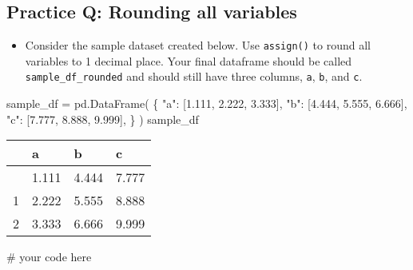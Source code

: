 \documentclass[
  letterpaper,
  DIV=11,
  numbers=noendperiod]{scrreprt}
\newenvironment{Shaded}{\begin{snugshade}}{\end{snugshade}}
\newcommand{\CommentTok}[1]{\textcolor[rgb]{0.37,0.37,0.37}{#1}}
\newcommand{\FloatTok}[1]{\textcolor[rgb]{0.68,0.00,0.00}{#1}}
\newcommand{\NormalTok}[1]{\textcolor[rgb]{0.00,0.23,0.31}{#1}}
\newcommand{\OperatorTok}[1]{\textcolor[rgb]{0.37,0.37,0.37}{#1}}
\newcommand{\StringTok}[1]{\textcolor[rgb]{0.13,0.47,0.30}{#1}}
\providecommand{\tightlist}{%
  \setlength{\itemsep}{0pt}\setlength{\parskip}{0pt}}\usepackage{longtable,booktabs,array}
\begin{document}
\begin{tcolorbox}[enhanced jigsaw, colframe=quarto-callout-tip-color-frame, opacityback=0, titlerule=0mm, bottomrule=.15mm, breakable, leftrule=.75mm, colbacktitle=quarto-callout-tip-color!10!white, title=\textcolor{quarto-callout-tip-color}{\faLightbulb}\hspace{0.5em}{Practice}, rightrule=.15mm, coltitle=black, opacitybacktitle=0.6, colback=white, left=2mm, arc=.35mm, toptitle=1mm, bottomtitle=1mm, toprule=.15mm]

\subsection{Practice Q: Rounding all
variables}\label{practice-q-rounding-all-variables}

\begin{itemize}
\tightlist
\item
  Consider the sample dataset created below. Use \texttt{assign()} to
  round all variables to 1 decimal place. Your final dataframe should be
  called \texttt{sample\_df\_rounded} and should still have three
  columns, \texttt{a}, \texttt{b}, and \texttt{c}.
\end{itemize}

\begin{Shaded}
\begin{Highlighting}[]
\NormalTok{sample\_df }\OperatorTok{=}\NormalTok{ pd.DataFrame(}
\NormalTok{    \{}
        \StringTok{"a"}\NormalTok{: [}\FloatTok{1.111}\NormalTok{, }\FloatTok{2.222}\NormalTok{, }\FloatTok{3.333}\NormalTok{],}
        \StringTok{"b"}\NormalTok{: [}\FloatTok{4.444}\NormalTok{, }\FloatTok{5.555}\NormalTok{, }\FloatTok{6.666}\NormalTok{],}
        \StringTok{"c"}\NormalTok{: [}\FloatTok{7.777}\NormalTok{, }\FloatTok{8.888}\NormalTok{, }\FloatTok{9.999}\NormalTok{],}
\NormalTok{    \}}
\NormalTok{)}
\NormalTok{sample\_df}
\end{Highlighting}
\end{Shaded}

\begin{longtable}[]{@{}llll@{}}
\toprule\noalign{}
& a & b & c \\
\midrule\noalign{}
\endhead
\bottomrule\noalign{}
\endlastfoot
0 & 1.111 & 4.444 & 7.777 \\
1 & 2.222 & 5.555 & 8.888 \\
2 & 3.333 & 6.666 & 9.999 \\
\end{longtable}

\begin{Shaded}
\begin{Highlighting}[]
\CommentTok{\# your code here}
\end{Highlighting}
\end{Shaded}

\end{tcolorbox}
\end{document}
